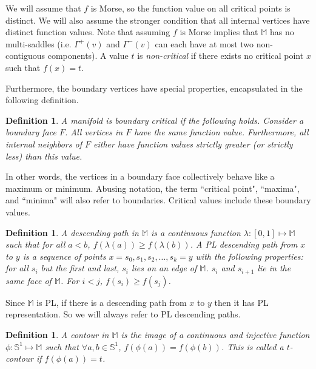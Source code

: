 \documentclass[11pt]{article}
\newtheorem{definition}[theorem]{Definition}
\theoremstyle{definition}
\newcommand{\innbd}{\Gamma^-}
\newcommand{\outnbd}{\Gamma^+}
\newcommand{\MM}{\mathbb{M}}
\newcommand{\SSS}{\mathbb{S}}
\begin{document}
We will assume that $f$ is Morse, so the function value on all critical points is distinct. 
We will also assume the stronger condition that all internal vertices have distinct function values.
Note that assuming $f$ is Morse implies that $\MM$ has no multi-saddles 
(i.e. $\outnbd(v)$ and $\innbd(v)$ can each have at most two non-contiguous components).
A value $t$ is \emph{non-critical} if there exists no critical point $x$ such that $f(x) = t$.

Furthermore, the boundary vertices have special properties, encapsulated in the following definition.

\begin{definition} \label{def:bound} A manifold is \emph{boundary critical} if the following holds.
Consider a boundary face $F$. All vertices in $F$ have the same function value. Furthermore, all
internal neighbors of $F$ either have function values strictly greater (or strictly less)
than this value.
\end{definition}

In other words, the vertices in a boundary face collectively behave like a maximum or minimum. 
Abusing notation, the term ``critical point", ``maxima", and ``minima" will also refer to boundaries.
Critical values include these boundary values.

\begin{definition} \label{def:desc} A \emph{descending path} in $\MM$ is a continuous function $\lambda:[0,1] \mapsto \MM$
such that for all $a < b$, $f(\lambda(a)) \geq f(\lambda(b))$. A \emph{PL descending path} from $x$ to $y$ is a sequence
of points $x = s_0, s_1, s_2, \ldots, s_k = y$ with the following properties: for all $s_i$ but the first and last,
$s_i$ lies on an edge of $\MM$. $s_i$ and $s_{i+1}$ lie in the same face of $\MM$. 
For $i < j$, $f(s_i) \geq f(s_j)$.
\end{definition}

Since $\MM$ is PL, if there is a descending path from $x$ to $y$ then it has PL representation. So we will always refer to
PL descending paths.

\begin{definition} \label{def:cont} A \emph{contour} in $\MM$ is the image of a continuous and injective function $\phi:\SSS^1 \mapsto \MM$ such that $\forall a, b \in \SSS^1$, $f(\phi(a)) = f(\phi(b))$. This is called a \emph{$t$-contour} if $f(\phi(a)) = t$.
\end{definition}
\end{document}
